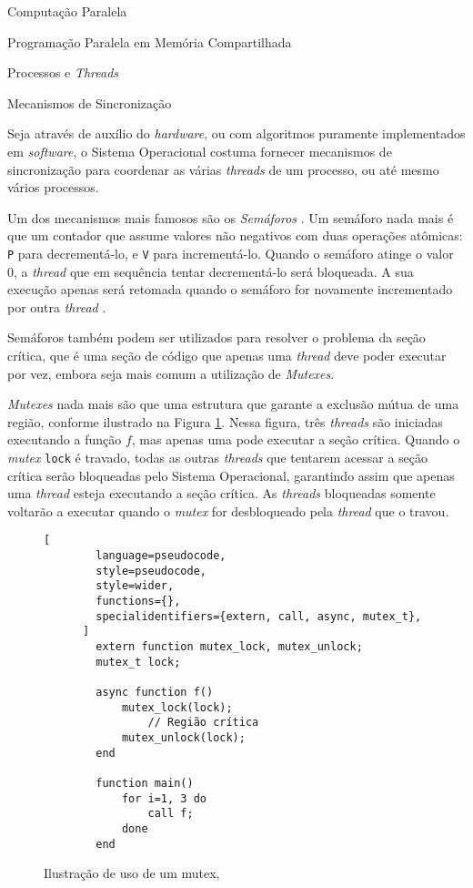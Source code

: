 \begin{section}{Computação Paralela}
\begin{subsection}{Programação Paralela em Memória Compartilhada}
\begin{subsubsection}{Processos e \textit{Threads}}
\end{subsubsection}

\begin{subsubsection}{Mecanismos de Sincronização}

	Seja através de auxílio do \textit{hardware}, ou com algoritmos
puramente implementados em \textit{software}, o Sistema Operacional
costuma fornecer mecanismos de sincronização para coordenar as várias
\textit{threads} de um processo, ou até mesmo vários processos.

    Um dos mecanismos mais famosos são os \textit{Semáforos}
\citep{dijkstra1965}. Um semáforo nada mais é que um contador que assume
valores não negativos com duas operações atômicas: \texttt{P} para
decrementá-lo, e \texttt{V} para incrementá-lo. Quando o semáforo atinge o
valor 0, a \textit{thread} que em sequência tentar decrementá-lo será bloqueada. A
sua execução apenas será retomada quando o semáforo for novamente incrementado
por outra \textit{thread} \citep{semaphore}.

    Semáforos também podem ser utilizados para resolver o problema da
seção crítica, que é uma seção de código que apenas uma \textit{thread}
deve poder executar por vez, embora seja mais comum a utilização
de \textit{Mutexes}.

\textit{Mutexes} nada mais são que uma estrutura que garante a exclusão
mútua de uma região, conforme ilustrado na Figura \ref{fig:mutex}. Nessa
figura, três \textit{threads} são iniciadas executando a função $f$, mas
apenas uma pode executar a seção crítica.
    Quando o \textit{mutex} \texttt{lock} é travado,
todas as outras \textit{threads} que tentarem acessar a seção crítica
serão bloqueadas pelo Sistema Operacional, garantindo assim que apenas
uma \textit{thread} esteja executando a seção crítica.
As \textit{threads} bloqueadas somente voltarão a executar quando o
    \textit{mutex} for desbloqueado pela \textit{thread} que o travou.
\begin{figure}
      \begin{lstlisting}[
        language=pseudocode,
        style=pseudocode,
        style=wider,
        functions={},
        specialidentifiers={extern, call, async, mutex_t},
      ]
        extern function mutex_lock, mutex_unlock;
        mutex_t lock;

        async function f()
            mutex_lock(lock);
                // Região crítica
            mutex_unlock(lock);
        end

        function main()
            for i=1, 3 do
                call f;
            done
        end
      \end{lstlisting}
      \caption{Ilustração de uso de um mutex,}
      \label{fig:mutex}
\end{figure}


\end{subsubsection}
\end{subsection}
\end{section}
